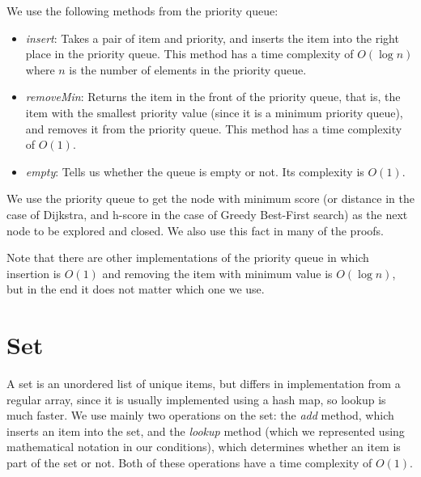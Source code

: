 \documentclass[a4paper,10pt]{report}
\begin{document}
\begin{appendices}
We use the following methods from the priority queue:
\begin{itemize}
\item \emph{insert}: Takes a pair of item and priority, and inserts the item into the right place in the priority queue. This method has a time complexity of $O(\log n)$ where $n$ is the number of elements in the priority queue.
\item \emph{removeMin}: Returns the item in the front of the priority queue, that is, the item with the smallest priority value (since it is a minimum priority queue), and removes it from the priority queue. This method has a time complexity of $O(1)$.
\item \emph{empty}: Tells us whether the queue is empty or not. Its complexity is $O(1)$.
\end{itemize}

We use the priority queue to get the node with minimum score (or distance in the case of Dijkstra, and h-score in the case of Greedy Best-First search) as the next node to be explored and closed. We also use this fact in many of the proofs.

Note that there are other implementations of the priority queue in which insertion is $O(1)$ and removing the item with minimum value is $O(\log n)$, but in the end it does not matter which one we use.

\section{Set}
A set is an unordered list of unique items, but differs in implementation from a regular array, since it is usually implemented using a hash map, so lookup is much faster. We use mainly two operations on the set: the \emph{add} method, which inserts an item into the set, and the \emph{lookup} method (which we represented using mathematical notation in our conditions), which determines whether an item is part of the set or not. Both of these operations have a time complexity of $O(1)$.


\end{appendices}
\end{document}
